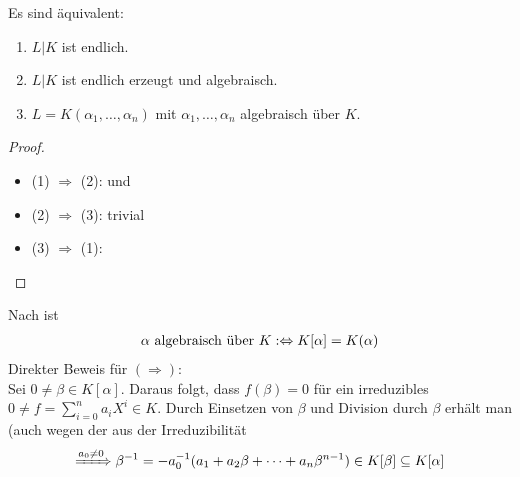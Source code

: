 
\begin{conclusion}
	Es sind äquivalent:
	\begin{enumerate}
		\item $L \vert K$ ist endlich.
		\item $L \vert K$ ist endlich erzeugt und algebraisch.
		\item $L = K(\alpha_1, \dots , \alpha_n)$ mit $\alpha_1, \dots, \alpha_n$ algebraisch über $K$.
	\end{enumerate}
\end{conclusion}

\begin{proof}
	\begin{itemize}
		\item (1) $\Rightarrow$ (2):  und 
		\item (2) $\Rightarrow$ (3): trivial
		\item (3) $\Rightarrow$ (1): 
	\end{itemize}
\end{proof}

\begin{remark}
	Nach  ist
	\begin{align}
	\alpha \text{ algebraisch über } K :\Leftrightarrow K[\alpha] = K(\alpha) \notag
	\end{align}
	Direkter Beweis für $(\Rightarrow)$: \\
	Sei $0 \neq \beta \in K[\alpha]$. Daraus folgt, dass $f(\beta) = 0$ für ein irreduzibles $0 \neq f = \sum_{i=0}^n a_i X^i \in K$. Durch Einsetzen von $\beta$ und Division durch $\beta$ erhält man (auch wegen der aus der Irreduzibilität
	\begin{align}
	\xRightarrow{a_0 \neq 0}\beta^{-1} = -a_0^{-1} ( a_1 + a_2 \beta + \dots + a_n \beta^{n-1}) \in K[\beta] \subseteq K[\alpha] \notag
	\end{align}
\end{remark}